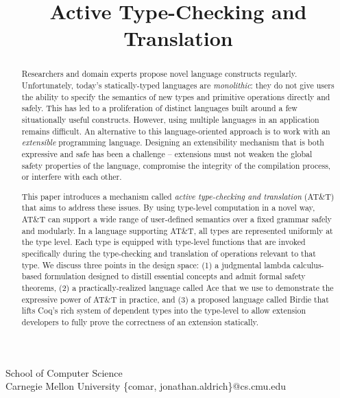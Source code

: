 \documentclass[9pt]{sigplanconf}
\begin{document}


\title{Active Type-Checking and Translation}

       {School of Computer Science\\
        Carnegie Mellon University}
        {\{comar, jonathan.aldrich\}@cs.cmu.edu}   

\maketitle
\begin{abstract}
Researchers and domain experts propose novel language constructs regularly. Unfortunately, today's statically-typed languages are {\it monolithic}: they do not give users the ability to specify the semantics of new types and primitive operations directly and safely. This has led to a   proliferation of distinct languages built around a few situationally useful  constructs. However, using multiple languages in an application remains difficult. 
An alternative to this language-oriented approach is to work with an {\it extensible} programming language. Designing an extensibility mechanism that is both expressive and safe has been a challenge -- extensions must not weaken the global safety properties of the language, compromise the integrity of the compilation process, or interfere with each other. 

This paper introduces a mechanism called {\it active type-checking and translation} (AT\&T) that aims to address these issues. By using type-level computation in a novel way, AT\&T can support a wide range of user-defined semantics over a fixed grammar safely and modularly. 
In a language supporting AT\&T, all types are represented uniformly at the type level. Each type is equipped with type-level functions that are invoked specifically during the type-checking and translation of operations relevant to that type. 
We discuss three points in the design space: (1) a judgmental lambda calculus-based  formulation designed to distill essential concepts and admit formal safety theorems, (2) a practically-realized language called Ace that we use to demonstrate the expressive power of AT\&T in practice, and (3) a proposed language called Birdie that lifts Coq's rich system of dependent types into the type-level to allow extension developers to fully prove the correctness of an extension statically.

\end{abstract}
\end{document}

